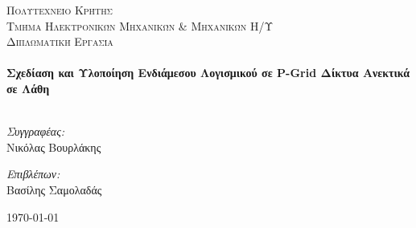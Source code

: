 \begin{titlepage}

\begin{center}



\textsc{\LARGE Πολυτεχνείο Κρήτης\\Τμήμα Ηλεκτρονικών Μηχανικών \& Μηχανικών Η/Υ}\\[1.5cm]

\textsc{\Large Διπλωματική Εργασία}\\[0.5cm]


\HRule \\[0.4cm]
{ \huge \bfseries Σχεδίαση και Υλοποίηση Ενδιάμεσου Λογισμικού σε P-Grid Δίκτυα Ανεκτικά σε Λάθη}\\[0.4cm]

\HRule \\[1.5cm]

\begin{minipage}{0.4\textwidth}
\begin{flushleft} \large
\emph{Συγγραφέας:} \\
Νικόλας Βουρλάκης
\end{flushleft}
\end{minipage}
\begin{minipage}{0.4\textwidth}
\begin{flushright} \large
\emph{Επιβλέπων:} \\
Βασίλης Σαμολαδάς
\end{flushright}
\end{minipage}

\vfill

{\large \today}

\end{center}

\end{titlepage}
